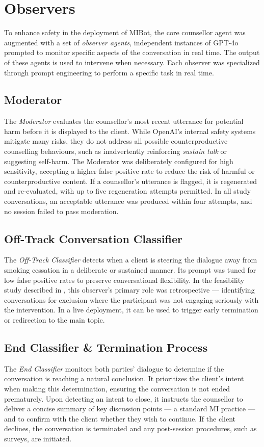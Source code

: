 \section{Observers}
\label{sec:observers}
To enhance safety in the deployment of MIBot, the core counsellor agent was augmented with a set of \textit{observer agents}, independent instances of GPT-4o prompted to monitor specific aspects of the conversation in real time. The output of these agents is used to intervene when necessary. Each observer was specialized through prompt engineering to perform a specific task in real time.

\subsection{Moderator}
The \textit{Moderator} evaluates the counsellor's most recent utterance for potential
harm before it is displayed to the client. While OpenAI's internal safety systems
mitigate many risks, they do not address all possible counterproductive counselling
behaviours, such as inadvertently reinforcing \emph{sustain talk} or suggesting
self-harm. The Moderator was deliberately configured for high sensitivity, accepting a
higher false positive rate to reduce the risk of harmful or counterproductive content.
If a counsellor's utterance is flagged, it is regenerated and re-evaluated, with up to
five regeneration attempts permitted. In all study conversations, an acceptable
utterance was produced within four attempts, and no session failed to pass moderation.

\subsection{Off-Track Conversation Classifier}
The \textit{Off-Track Classifier} detects when a client is steering the dialogue away
from smoking cessation in a deliberate or sustained manner. Its prompt was tuned for
low false positive rates to preserve conversational flexibility. In the feasibility
study described in , this observer's primary role was
retrospective --- identifying conversations for exclusion where the participant was not
engaging seriously with the intervention. In a live deployment, it can be used to
trigger early termination or redirection to the main topic.

\subsection{End Classifier \& Termination Process}
The \textit{End Classifier} monitors both parties' dialogue to determine if the
conversation is reaching a natural conclusion. It prioritizes the client's intent when
making this determination, ensuring the conversation is not ended prematurely. Upon
detecting an intent to close, it instructs the counsellor to deliver a concise summary
of key discussion points --- a standard MI practice --- and to confirm with the client
whether they wish to continue. If the client declines, the conversation is terminated
and any post-session procedures, such as surveys, are initiated.

